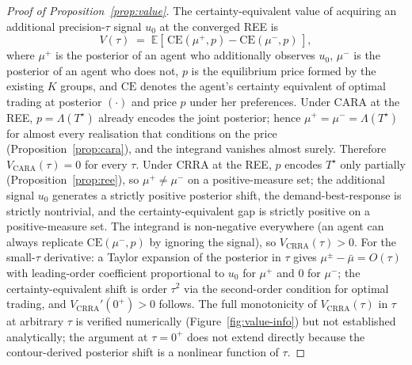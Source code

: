 \documentclass[12pt,letterpaper]{article}
\theoremstyle{definition}
\theoremstyle{remark}
\newcommand{\E}{\mathbb{E}}
\newcommand{\Lam}{\Lambda}            %
\newcommand{\Tstar}{T^{\!\star}}
\newcommand{\1}{\mathbf{1}}
\begin{document}
\begin{proof}[Proof of Proposition~\ref{prop:value}]
The certainty-equivalent value of acquiring an additional precision-$\tau$
signal $u_{0}$ at the converged REE is
\[
   V(\tau) \;=\;
   \E\!\left[\,\mathrm{CE}\!\left(\mu^{+}\!,p\right)
            -\mathrm{CE}\!\left(\mu^{-}\!,p\right)\,\right],
\]
where $\mu^{+}$ is the posterior of an agent who additionally observes
$u_{0}$, $\mu^{-}$ is the posterior of an agent who does not, $p$ is the
equilibrium price formed by the existing $K$ groups, and $\mathrm{CE}$
denotes the agent's certainty equivalent of optimal trading at posterior
$(\cdot)$ and price $p$ under her preferences.
Under CARA at the REE, $p=\Lam(\Tstar)$ already encodes the joint
posterior; hence $\mu^{+}=\mu^{-}=\Lam(\Tstar)$ for almost every realisation
that conditions on the price (Proposition~\ref{prop:cara}), and the
integrand vanishes almost surely. Therefore
$V_{\mathrm{CARA}}(\tau)=0$ for every $\tau$.
Under CRRA at the REE, $p$ encodes $\Tstar$ only partially
(Proposition~\ref{prop:ree}), so $\mu^{+}\neq\mu^{-}$ on a positive-measure
set; the additional signal $u_{0}$ generates a strictly positive posterior
shift, the demand-best-response is strictly nontrivial, and the
certainty-equivalent gap is strictly positive on a positive-measure set.
The integrand is non-negative everywhere (an agent can always replicate
$\mathrm{CE}(\mu^{-},p)$ by ignoring the signal), so $V_{\mathrm{CRRA}}(\tau)>0$.
For the small-$\tau$ derivative: a Taylor expansion of the posterior in
$\tau$ gives $\mu^{\pm}-\bar\mu=O(\tau)$ with leading-order coefficient
proportional to $u_{0}$ for $\mu^{+}$ and $0$ for $\mu^{-}$; the
certainty-equivalent shift is order $\tau^{2}$ via the second-order
condition for optimal trading, and $V_{\mathrm{CRRA}}'(0^{+})>0$ follows.
The full monotonicity of $V_{\mathrm{CRRA}}(\tau)$ in $\tau$ at arbitrary
$\tau$ is verified numerically (Figure~\ref{fig:value-info}) but not
established analytically; the argument at $\tau=0^{+}$ does not extend
directly because the contour-derived posterior shift is a nonlinear
function of $\tau$.
\end{proof}
\end{document}
